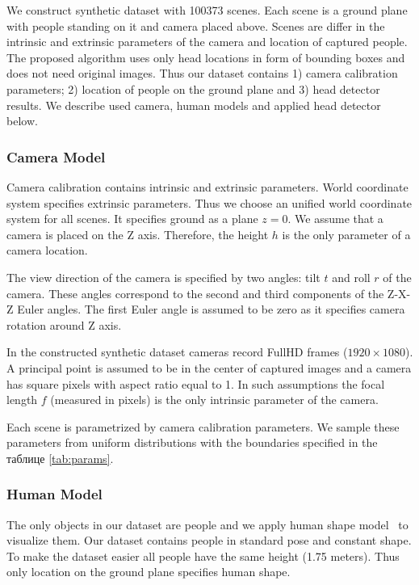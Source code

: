 We construct synthetic dataset with 100373 scenes. Each scene is a ground plane with people standing on it and camera placed above. Scenes are differ in the intrinsic and extrinsic parameters of the camera and location of captured people. The proposed algorithm uses only head locations in form of bounding boxes and does not need original images. Thus our dataset contains 1) camera calibration parameters; 2) location of people on the ground plane and 3) head detector results. We describe used camera, human models and applied head detector below.

\subsubsection{Camera Model}

\noindent Camera calibration contains intrinsic and extrinsic parameters. World coordinate system specifies extrinsic parameters. Thus we choose an unified world coordinate system for all scenes. It specifies ground as a plane $z = 0$. We assume that a camera is placed on the Z axis. Therefore, the height $h$ is the only parameter of a camera location.

The view direction of the camera is specified by two angles: tilt $t$ and roll $r$ of the camera. These angles correspond to the second and third components of the Z-X-Z Euler angles. The first Euler angle is assumed to be zero as it specifies camera rotation around Z axis.

In the constructed synthetic dataset cameras record FullHD frames ($1920\times1080$). A principal point is assumed to be in the center of captured images and a camera has square pixels with aspect ratio equal to 1. In such assumptions the focal length $f$ (measured in pixels) is the only intrinsic parameter of the camera.

Each scene is parametrized by camera calibration parameters. We sample these parameters from uniform distributions with the boundaries specified in the таблице \ref{tab:params}.

\subsubsection{Human Model}

\noindent The only objects in our dataset are people and we apply human shape model~\cite{pishchulin2015building} to visualize them. Our dataset contains people in standard pose and constant shape. To make the dataset easier all people have the same height (1.75 meters). Thus only location on the ground plane specifies human shape.

